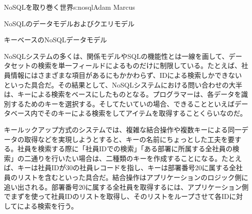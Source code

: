 \begin{aosachapter}{NoSQLを取り巻く世界}{s:nosql}{Adam Marcus}
\begin{aosasect1}{NoSQLのデータモデルおよびクエリモデル}
\begin{aosasect2}{キーベースのNoSQLデータモデル}

NoSQLシステムの多くは、関係モデルやSQLの機能性とは一線を画して、データセットの検索を単一フィールドによるものだけに制限している。たとえば、社員情報にはさまざまな項目があるにもかかわらず、IDによる検索しかできないといった具合だ。その結果として、NoSQLシステムにおける問い合わせの大半は、キーによる検索をベースにしたものとなる。プログラマーは、各データを識別するためのキーを選択する。そしてたいていの場合、できることといえばデータベース内でそのキーによる検索をしてアイテムを取得することくらいなのだ。

キールックアップ方式のシステムでは、複雑な結合操作や複数キーによる同一データの取得などを実現しようとすると、キーの名前にちょっとした工夫を要する。社員を検索する際に「社員IDでの検索」「ある部署に所属する全社員の検索」の二通りを行いたい場合は、二種類のキーを作成することになる。たとえば、キーは社員IDが30の社員レコードを指し、キーは部署番号20に属する全社員のリストを含むといった具合だ。結合操作はアプリケーションのロジック側に追い出される。部署番号20に属する全社員を取得するには、アプリケーション側でまずを使って社員IDのリストを取得し、そのリストをループさせて各IDに対してによる検索を行う。


\end{aosasect2}
\end{aosasect1}
\end{aosachapter}
